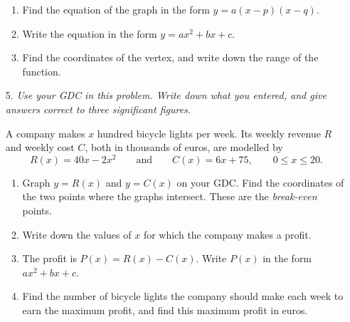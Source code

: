\documentclass[12pt, twoside]{article}
\begin{document}
\begin{enumerate}[itemsep=0.15cm]
\begin{enumerate}[itemsep=0.1cm]
  \item Find the equation of the graph in the form $y = a(x - p)(x - q)$.
  \vfill
  \item Write the equation in the form $y = ax^{2} + bx + c$. \vfill
  \item Find the coordinates of the vertex, and write down the range of the
  function. \vfill
\end{enumerate}

\newpage

\item[5.]
\emph{Use your GDC in this problem. Write down what you entered, and give
answers correct to three significant figures.}

A company makes $x$ hundred bicycle lights per week. Its weekly revenue $R$
and weekly cost $C$, both in thousands of euros, are modelled by
\[
R(x) = 40x - 2x^{2} \qquad \text{and} \qquad C(x) = 6x + 75,
\qquad 0 \le x \le 20.
\]

\begin{enumerate}[itemsep=0.1cm]
  \item Graph $y = R(x)$ and $y = C(x)$ on your GDC. Find the
  coordinates of the two points where the graphs intersect. These are the
  \emph{break-even} points. \vfill
  \item Write down the values of $x$ for which the company makes a
  profit. \vfill
  \item The profit is $P(x) = R(x) - C(x)$. Write $P(x)$ in the form
  $ax^{2} + bx + c$. \vfill
  \item Find the number of bicycle lights the company should make each
  week to earn the maximum profit, and find this maximum profit in euros.
  \vfill
\end{enumerate}

\end{enumerate}
\end{document}
